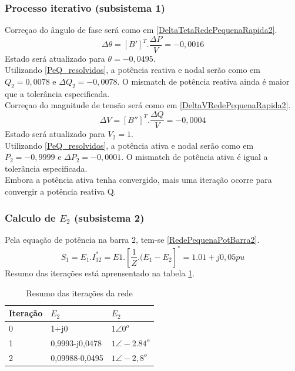 \subsubsection{Processo iterativo (subsistema 1)}
Correçao do ângulo de fase será como em \ref{DeltaTetaRedePequenaRapida2}.
\begin{equation}
            \Delta \theta = [B']^T . \frac{\Delta P}{V} = -0,0016
            \label{DeltaTetaRedePequenaRapida2}
\end{equation}
Estado será atualizado para $\theta = -0,0495$.\\
Utilizando \ref{PeQ_resolvidos}, a potência reativa e nodal serão como em $Q_2 = 0,0078$ e $\Delta Q_2 = -0,0078$. O mismatch de potência reativa ainda é maior que a tolerância especificada.\\
Correçao do magnitude de tensão será como em \ref{DeltaVRedePequenaRapida2}.
\begin{equation}
            \Delta V = [B'']^T . \frac{\Delta Q}{V} = -0,0004
            \label{DeltaVRedePequenaRapida}
\end{equation}
Estado será atualizado para $V_2 = 1$.\\
Utilizando \ref{PeQ_resolvidos}, a potência ativa e nodal serão como em $P_2 = -0,9999$ e $\Delta P_2 = -0,0001$. O mismatch de potência ativa é igual a tolerância especificada.\\ 
Embora a potência ativa tenha convergido, mais uma iteração ocorre para convergir a potência reativa Q.

\subsubsection{Calculo de $E_2$ (subsistema 2)}
Pela equação de potência na barra $2$, tem-se \ref{RedePequenaPotBarra2}.
\begin{equation}
    S_1 = E_1.I^*_12=E1.[\frac{1}{Z}.(E_1-E_2]^*= 1.01+j0,05pu
    \label{RedePequenaPotBarra2}
\end{equation}
Resumo das iterações está aprensentado na tabela \ref{t_redePequenaResumoRapido}.
\begin{table}[!htb]
\centering
\caption{Resumo das iterações da rede}
\begin{tabular}{lll}
\hline
Iteração & $E_2$          & $E_2$ \\ \hline
0        & 1+j0           & $1\angle 0^o$ \\
1        & 0,9993-j0,0478      & $1 \angle -2.84^o$ \\
2        & 0,09988-0,0495 & $1 \angle -2,8^o$ \\ \hline
\end{tabular}
\label{t_redePequenaResumoRapido}
\end{table}



